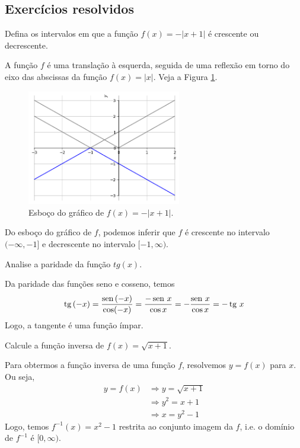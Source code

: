 \documentclass[../main.tex]{subfiles}
\begin{document}
\subsection{Exercícios resolvidos}
\begin{exeresol}
  Defina os intervalos em que a função $f(x) = -|x+1|$ é crescente ou decrescente.\\
  \begin{resol}
  A função $f$ é uma translação à esquerda, seguida de uma reflexão em torno do eixo das abscissas da função $f(x) = |x|$. Veja a Figura \ref{fig:exeresol_funprop_mono}.

  \begin{figure}[H]
    \centering
    \includegraphics[width=0.6\textwidth]{fig_func/fig_exeresol_funprop_mono.png}
    \caption{Esboço do gráfico de $f(x) = -|x+1|$.}
    \label{fig:exeresol_funprop_mono}
  \end{figure}

  Do esboço do gráfico de $f$, podemos inferir que $f$ é crescente no intervalo $(-\infty, -1]$ e decrescente no intervalo $[-1, \infty)$.
\end{resol}
\end{exeresol}
\begin{exeresol}
  Analise a paridade da função $tg(x)$.
  \begin{resol}
  Da paridade das funções seno e cosseno, temos
  \begin{equation}
    \operatorname{tg}\,(-x) = \frac{\operatorname{sen}\,(-x)}{\cos(-x)} = \frac{-\operatorname{sen}\, x}{\cos x} = -\frac{\operatorname{sen}\, x}{\cos x} = -\operatorname{tg}\, x
  \end{equation}
  Logo, a tangente é uma função ímpar.
\end{resol}
\end{exeresol}
\begin{exeresol}
  Calcule a função inversa de $f(x) = \sqrt{x+1}$.
  \begin{resol}
  Para obtermos a função inversa de uma função $f$, resolvemos $y = f(x)$ para $x$. Ou seja,
  \begin{align*}
    y = f(x) &\Rightarrow y = \sqrt{x+1}\\
             &\Rightarrow y^2 = x+1\\
             &\Rightarrow x = y^2 - 1
  \end{align*}
  Logo, temos $f^{-1}(x) = x^2 - 1$ restrita ao conjunto imagem da $f$, i.e. o domínio de $f^{-1}$ é $[0, \infty)$.
\end{resol}
\end{exeresol}
\end{document}
